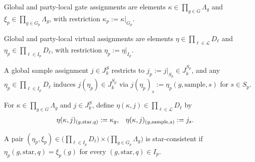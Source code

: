 \begin{definition}
    \label{def:compression_operator_gate_labels}
    \leanok
    Global and party-local gate assignments are elements $\kappa\in\prod_{g\in G}\Lambda_g$ and $\xi_p\in\prod_{g\in G_p}\Lambda_g$, with restriction $\kappa_p:=\kappa|_{G_p}$.
\end{definition}

\begin{definition}
    \label{def:compression_operator_link_labels}
    \leanok
    Global and party-local virtual assignments are elements $\eta\in\prod_{\ell\in\mathcal L}D_\ell$ and $\eta_p\in\prod_{\ell\in I_p}D_\ell$, with restriction $\eta_p:=\eta|_{I_p}$.
\end{definition}

\begin{definition}
    \label{def:compression_operator_sample_labels}
    \leanok
    A global sample assignment $j\in J_k^S$ restricts to $j_p:=j|_{S_p}\in J_k^{S_p}$, and any $\eta_p\in\prod_{\ell\in I_p}D_\ell$ induces $j(\eta_p)\in J_k^{S_p}$ via $j(\eta_p)_s:=\eta_p(g,\mathrm{sample},s)$ for $s\in S_p$.
\end{definition}

\begin{definition}
    \label{def:compression_operator_shared_labels}
    \leanok
    For $\kappa\in\prod_{g\in G}\Lambda_g$ and $j\in J_k^S$, define $\eta(\kappa,j)\in\prod_{\ell\in\mathcal L}D_\ell$ by
    \begin{align}
        \eta(\kappa,j)_{(g,\mathrm{star},q)}   & := \kappa_g,   &
        \eta(\kappa,j)_{(g,\mathrm{sample},s)} & := j_s. \notag
    \end{align}
\end{definition}

\begin{definition}
    \label{def:compression_operator_consistency}
    \leanok
    A pair $(\eta_p,\xi_p)\in\bigl(\prod_{\ell\in I_p}D_\ell\bigr)\times\bigl(\prod_{g\in G_p}\Lambda_g\bigr)$ is star-consistent if $\eta_p(g,\mathrm{star},q)=\xi_p(g)$ for every $(g,\mathrm{star},q)\in I_p$.
\end{definition}

